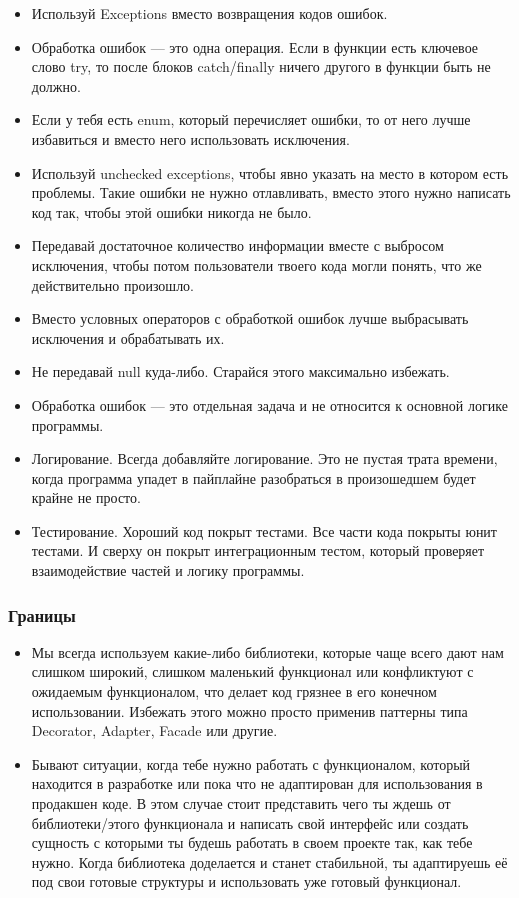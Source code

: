 \begin{itemize}
	\item Используй Exceptions вместо возвращения кодов ошибок.
	\item Обработка ошибок — это одна операция. Если в функции есть ключевое слово try, то после блоков catch/finally ничего другого в функции быть не должно.
	\item Если у тебя есть enum, который перечисляет ошибки, то от него лучше избавиться и вместо него использовать исключения.
	\item Используй unchecked exceptions, чтобы явно указать на место в котором есть проблемы. Такие ошибки не нужно отлавливать, вместо этого нужно написать код так, чтобы этой ошибки никогда не было.
	\item Передавай достаточное количество информации вместе с выбросом исключения, чтобы потом пользователи твоего кода могли понять, что же действительно произошло.
	\item Вместо условных операторов с обработкой ошибок лучше выбрасывать исключения и обрабатывать их.
	\item Не передавай null куда-либо. Старайся этого максимально избежать.
	\item Обработка ошибок — это отдельная задача и не относится к основной логике программы.
	\item Логирование. Всегда добавляйте логирование. Это не пустая трата времени, когда программа упадет в пайплайне разобраться в произошедшем будет крайне не просто.
	\item Тестирование. Хороший код покрыт тестами. Все части кода покрыты юнит тестами. И сверху он покрыт интеграционным тестом, который проверяет взаимодействие частей и логику программы.
\end{itemize}

\subsubsection{Границы}

\begin{itemize}
	\item Мы всегда используем какие-либо библиотеки, которые чаще всего дают нам слишком широкий, слишком маленький функционал или конфликтуют с ожидаемым функционалом, что делает код грязнее в его конечном использовании. Избежать этого можно просто применив паттерны типа Decorator, Adapter, Facade или другие.
	\item Бывают ситуации, когда тебе нужно работать с функционалом, который находится в разработке или пока что не адаптирован для использования в продакшен коде. В этом случае стоит представить чего ты ждешь от библиотеки/этого функционала и написать свой интерфейс или создать сущность с которыми ты будешь работать в своем проекте так, как тебе нужно. Когда библиотека доделается и станет стабильной, ты адаптируешь её под свои готовые структуры и использовать уже готовый функционал.
\end{itemize}

